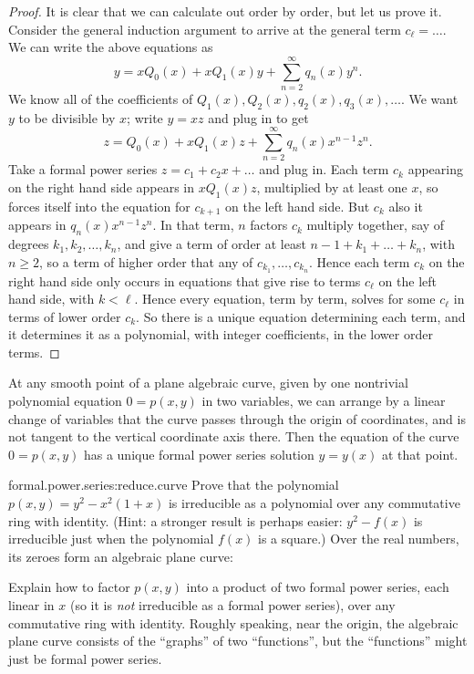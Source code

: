 \begin{proof}
It is clear that we can calculate out order by order, but let us prove it.
Consider the general induction argument to arrive at the general term \(c_{\ell}=\dots\). 
We can write the above equations as
\[
y=xQ_0(x)+xQ_1(x)y+\sum_{n=2}^{\infty} q_n(x)y^n.
\]
We know all of the coefficients of \(Q_1(x),Q_2(x),q_2(x),q_3(x),\dots\).
We want \(y\) to be divisible by \(x\); write \(y=xz\) and plug in to get
\[
z=Q_0(x)+xQ_1(x)z+\sum_{n=2}^{\infty} q_n(x)x^{n-1}z^n.
\]
Take a formal power series \(z=c_1+c_2x+\dots\) and plug in.
Each term \(c_k\) appearing on the right hand side appears in \(xQ_1(x)z\), multiplied by at least one \(x\), so forces itself into the equation for \(c_{k+1}\) on the left hand side.
But \(c_k\) also it appears in \(q_n(x)x^{n-1}z^n\).
In that term, \(n\) factors \(c_k\) multiply together, say of degrees \(k_1,k_2,\dots,k_n\), and give a term of order at least \(n-1+k_1+\dots+k_n\), with \(n\ge 2\), so a term of higher order that any of \(c_{k_1},\dots,c_{k_n}\).
Hence each term \(c_k\) on the right hand side only occurs in equations that give rise to terms \(c_{\ell}\) on the left hand side, with \(k<\ell\).
Hence every equation, term by term, solves for some \(c_{\ell}\) in terms of lower order \(c_k\).
So there is a unique equation determining each term, and it determines it as a polynomial, with integer coefficients, in the lower order terms.
\end{proof}
\begin{corollary}
At any smooth point of a plane algebraic curve, given by one nontrivial polynomial equation \(0=p(x,y)\) in two variables, we can arrange by a linear change of variables that the curve passes through the origin of coordinates, and is not tangent to the vertical coordinate axis there.
Then the equation of the curve \(0=p(x,y)\) has a unique formal power series solution \(y=y(x)\) at that point.
\end{corollary}
\begin{problem}{formal.power.series:reduce.curve}
Prove that the polynomial \(p(x,y)=y^2-x^2(1+x)\) is irreducible as a polynomial over any commutative ring with identity.
(Hint: a stronger result is perhaps easier: \(y^2-f(x)\) is irreducible just when the polynomial \(f(x)\) is a square.)
Over the real numbers, its zeroes form an algebraic plane curve:
\begin{center}
\pgfplotsset{compat=1.12,width=7cm}%

\end{center}
Explain how to factor \(p(x,y)\) into a product of two formal power series, each linear in \(x\) (so it is \emph{not} irreducible as a formal power series), over any commutative ring with identity.
Roughly speaking, near the origin, the algebraic plane curve consists of the ``graphs'' of two ``functions'', but the ``functions'' might just be formal power series.
\end{problem}
